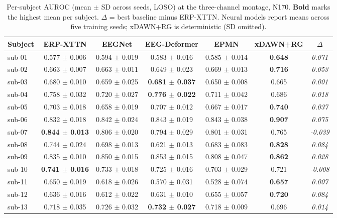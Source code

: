 \begin{table}[t]
\centering
\caption{Per-subject AUROC (mean $\pm$ SD across seeds, LOSO) at the three-channel montage, N170. \textbf{Bold} marks the highest mean per subject. $\Delta$ = best baseline minus ERP-XTTN. Neural models report means across five training seeds; xDAWN+RG is deterministic (SD omitted).}
\label{sup:tab-persubj-n170}
\begin{tabular}{lcccccc}
\toprule
Subject & ERP-XTTN & EEGNet & EEG-Deformer & EPMN & xDAWN+RG & $\Delta$ \\
\midrule
sub-01 & 0.577 $\pm$ 0.006 & 0.594 $\pm$ 0.019 & 0.583 $\pm$ 0.016 & 0.585 $\pm$ 0.014 & \textbf{0.648} & \textit{0.071} \\
sub-02 & 0.663 $\pm$ 0.007 & 0.663 $\pm$ 0.011 & 0.649 $\pm$ 0.023 & 0.669 $\pm$ 0.013 & \textbf{0.716} & \textit{0.053} \\
sub-03 & 0.680 $\pm$ 0.010 & 0.659 $\pm$ 0.025 & \textbf{0.681 $\pm$ 0.037} & 0.650 $\pm$ 0.008 & 0.665 & \textit{0.001} \\
sub-04 & 0.758 $\pm$ 0.032 & 0.720 $\pm$ 0.027 & \textbf{0.776 $\pm$ 0.022} & 0.711 $\pm$ 0.042 & 0.686 & \textit{0.018} \\
sub-05 & 0.703 $\pm$ 0.018 & 0.658 $\pm$ 0.019 & 0.707 $\pm$ 0.012 & 0.667 $\pm$ 0.017 & \textbf{0.740} & \textit{0.037} \\
sub-06 & 0.832 $\pm$ 0.018 & 0.842 $\pm$ 0.024 & 0.843 $\pm$ 0.019 & 0.843 $\pm$ 0.038 & \textbf{0.907} & \textit{0.075} \\
sub-07 & \textbf{0.844 $\pm$ 0.013} & 0.806 $\pm$ 0.020 & 0.794 $\pm$ 0.029 & 0.801 $\pm$ 0.031 & 0.765 & \textit{-0.039} \\
sub-08 & 0.744 $\pm$ 0.024 & 0.698 $\pm$ 0.013 & 0.621 $\pm$ 0.013 & 0.683 $\pm$ 0.083 & \textbf{0.828} & \textit{0.084} \\
sub-09 & 0.835 $\pm$ 0.010 & 0.850 $\pm$ 0.015 & 0.853 $\pm$ 0.015 & 0.808 $\pm$ 0.047 & \textbf{0.862} & \textit{0.028} \\
sub-10 & \textbf{0.741 $\pm$ 0.016} & 0.733 $\pm$ 0.018 & 0.725 $\pm$ 0.016 & 0.703 $\pm$ 0.029 & 0.721 & \textit{-0.008} \\
sub-11 & 0.650 $\pm$ 0.019 & 0.618 $\pm$ 0.026 & 0.570 $\pm$ 0.031 & 0.528 $\pm$ 0.074 & \textbf{0.657} & \textit{0.007} \\
sub-12 & 0.636 $\pm$ 0.016 & 0.612 $\pm$ 0.022 & 0.631 $\pm$ 0.010 & 0.655 $\pm$ 0.057 & \textbf{0.720} & \textit{0.084} \\
sub-13 & 0.718 $\pm$ 0.035 & 0.726 $\pm$ 0.032 & \textbf{0.732 $\pm$ 0.027} & 0.718 $\pm$ 0.009 & 0.696 & \textit{0.014} \\

\end{tabular}
\end{table}
